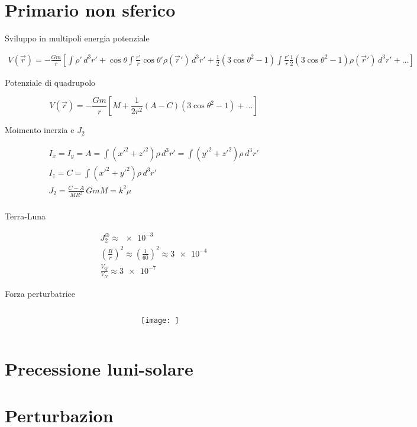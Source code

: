 \section{Primario non sferico}

\begin{frame}{Sviluppo in multipoli energia potenziale}

\begin{align*}
V(\vec{r})=-\frac{Gm}{r}[\int\rho'\,d^3r'+\cos{\theta}\int\frac{r'}{r}\cos{\theta'}\rho(\vec{r}')\,d^3r'+\frac{1}{2}(3\cos{\theta}^2-1)\int\frac{r'}{r}\frac{1}{2}(3\cos{\theta}^2-1)\rho(\vec{r}')\,d^3r'+\ldots]
\end{align*}

\begin{block}{Potenziale di quadrupolo}

\begin{equation*}
V(\vec{r})=-\frac{Gm}{r}[M+\frac{1}{2r^2}(A-C)(3\cos{\theta}^2-1)+\ldots]
\end{equation*}

\end{block}

\end{frame}

\begin{wordonframe}{Moimento inerzia e $J_2$}

\begin{align*}
I_x=I_y=A=\int(x'^2+z'^2)\rho\,d^3r'=\int(y'^2+z'^2)\rho\,d^3r'\\
I_z=C=\int(x'^2+y'^2)\rho\,d^3r'\\
J_2=\frac{C-A}{MR^2}\, GmM=k^2\mu\\
\end{align*}

\begin{block}{Terra-Luna}

\begin{align*}
J_2^{\oplus}\approx\num{e-3}\\
(\frac{R}{r})^2\approx(\frac{1}{60})^2\approx\num{3e-4}\\
\frac{V_Q}{V_N}\approx\num{3e-7}
\end{align*}

\end{block}

\end{wordonframe}

\begin{frame}{Forza perturbatrice}

\begin{columns}  \begin{column}{\textwidth}\end{column} \begin{column}{\textwidth} \begin{figure}[!ht]\texttt{[image: ]}\end{figure}
 \end{column}  \end{columns}


\end{frame}


\section{Precessione luni-solare}

\section{Perturbazion}